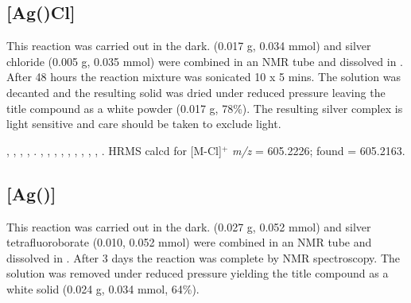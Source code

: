 
\subsection*{[Ag(\tBuxantphos)Cl]}


This reaction was carried out in the dark.  \tBuXantphos{} (0.017 g, 0.034 mmol) and silver chloride (0.005 g, 0.035 mmol) were combined in an NMR tube and dissolved in .  After 48 hours the reaction mixture was sonicated 10 x 5 mins.  The solution was decanted and the resulting solid was dried under reduced pressure leaving the title compound as a white powder (0.017 g, 78\%).  The resulting silver complex is light sensitive and care should be taken to exclude light.

,
,
,
,
.
,
,
,
,
,
,
,
,
,
.
HRMS calcd for  [M-Cl]$^+$ \emph{m/z} = 605.2226; found = 605.2163.


\subsection*{\texorpdfstring{[Ag(\tBusixantphos)]} A}


This reaction was carried out in the dark.  \tBuSixantphos{} (0.027 g, 0.052 mmol) and silver tetrafluoroborate (0.010, 0.052 mmol) were combined in an NMR tube and dissolved in .  After 3 days the reaction was complete by NMR spectroscopy.  The solution was removed under reduced pressure yielding the title compound as a white solid (0.024 g, 0.034 mmol, 64\%).

